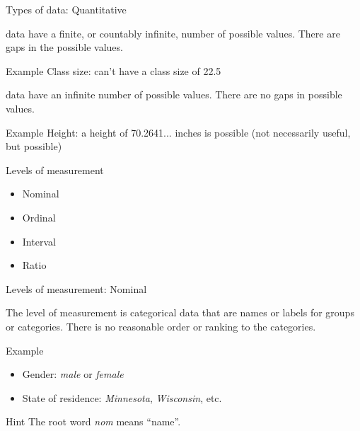 \documentclass[xcolor=table, aspectratio=169, bigger]{beamer}
\begin{document}
\begin{frame}{Types of data: Quantitative}
\begin{block}{}
 data have a finite, or countably infinite, number of possible values. There are gaps in the possible values.
\end{block}

\begin{exampleblock}{Example}
Class size: can't have a class size of 22.5
\end{exampleblock}
\pause
\begin{block}{}
 data have an infinite number of possible values. There are no gaps in possible values.
\end{block}

\begin{exampleblock}{Example}
Height: a height of 70.2641... inches is possible (not necessarily useful, but possible)
\end{exampleblock}

\end{frame}

\begin{frame}{Levels of measurement}
\begin{block}{}
\begin{itemize}
\item Nominal
\item Ordinal
\item Interval
\item Ratio
\end{itemize}
\end{block}
\end{frame}


\begin{frame}{Levels of measurement: Nominal}
\begin{block}{}
The  level of measurement is categorical data that are names or labels for groups or categories. There is no reasonable order or ranking to the categories.
\end{block}
\pause
\begin{exampleblock}{Example}
\begin{itemize}
\item Gender: \emph{male} or \emph{female}
\item State of residence: \emph{Minnesota}, \emph{Wisconsin}, etc.
\end{itemize}
\end{exampleblock}
\pause
\begin{alertblock}{Hint}
The root word \emph{nom} means ``name''.
\end{alertblock}
\end{frame}
\end{document}

